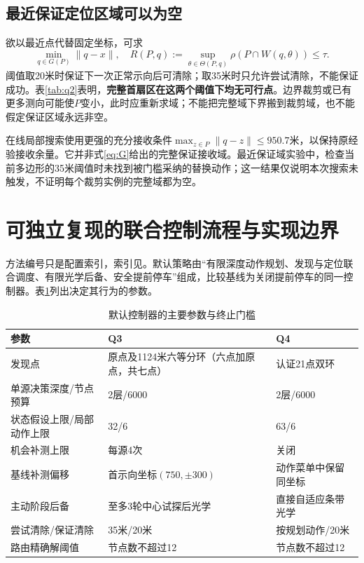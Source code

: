 \documentclass[UTF8,a4paper,zihao=-4,fontset=fandol]{ctexart}
\begin{document}
\subsection{最近保证定位区域可以为空}
欲以最近点代替固定坐标，可求
\begin{equation}\label{eq:guarantee}
\min_{q\in G(P)}\|q-x\|,\quad R(P,q):=\sup_{\theta\in\Theta(P,q)}\rho(P\cap W(q,\theta))\le\tau.
\end{equation}
阈值取20米时保证下一次正常示向后可清除；取35米时只允许尝试清除，不能保证成功。表\ref{tab:q2}表明，\textbf{完整首扇区在这两个阈值下均无可行点}。边界裁剪或已有更多测向可能使$P$变小，此时应重新求域；不能把完整域下界搬到裁剪域，也不能假定保证区域永远非空。

在线局部搜索使用更强的充分接收条件$\max_{z\in P}\|q-z\|\le950.7$米，以保持原经验接收余量。它并非式\eqref{eq:G}给出的完整保证接收域。最近保证域实验中，检查当前多边形的35米阈值时未找到被门槛采纳的替换动作；这一结果仅说明本次搜索未触发，不证明每个裁剪实例的完整域都为空。

\section{可独立复现的联合控制流程与实现边界}
方法编号只是配置索引，索引见。默认策略由“有限深度动作规划、发现与定位联合调度、有限光学后备、安全提前停车”组成，比较基线为关闭提前停车的同一控制器。表\ref{tab:parameters}列出决定其行为的参数。
\begin{table}[!htbp]\centering\small\caption{默认控制器的主要参数与终止门槛}\label{tab:parameters}
\begin{tabular}{p{4.6cm}p{4.35cm}p{4.35cm}}\toprule 参数&Q3&Q4\\\midrule
发现点&原点及1124米六等分环（六点加原点，共七点）&认证21点双环\\
单源决策深度/节点预算&2层/6000&2层/6000\\
状态假设上限/局部动作上限&32/6&63/6\\
机会补测上限&每源4次&关闭\\
基线补测偏移&首示向坐标$(750,\pm300)$&动作菜单中保留同坐标\\
主动阶段后备&至多3轮中心试探后光学&直接自适应条带光学\\
尝试清除/保证清除&35米/20米&按规划动作/20米\\
路由精确解阈值&节点数不超过12&节点数不超过12\\\bottomrule\end{tabular}\end{table}
\end{document}
